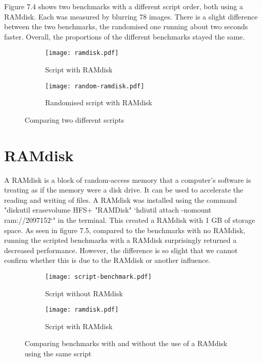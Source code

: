 Figure 7.4 shows two benchmarks with a different script order, both using a RAMdisk. Each was measured by blurring 78 images. There is a slight difference between the two benchmarks, the randomised one running about two seconds faster. Overall, the proportions of the different benchmarks stayed the same.

\begin{figure}[H]
	\centering
	\begin{subfigure}{.5\textwidth}
	  \centering
	  \texttt{[image: ramdisk.pdf]}
	  \caption{Script with RAMdisk}
	  \label{fig:ramdisk}
	\end{subfigure}%
	\begin{subfigure}{.5\textwidth}
	  \centering
	  \texttt{[image: random-ramdisk.pdf]}
	  \caption{Randomised script with RAMdisk}
	  \label{fig:random-ramdisk}
	\end{subfigure}
	\caption{Comparing two different scripts}
	\label{fig:two-scripts}
\end{figure}

\section{RAMdisk}
A RAMdisk is a block of random-access memory that a computer's software is treating as if the memory were a disk drive. It can be used to accelerate the reading and writing of files. A RAMdisk was installed using the command "diskutil erasevolume HFS+ "RAMDisk" `hdiutil attach -nomount ram://2097152`" in the terminal. This created a RAMdisk with 1 GB of storage space.
As seen in figure 7.5, compared to the benchmarks with no RAMdisk, running the scripted benchmarks with a RAMdisk surprisingly returned a decreased performance. However, the difference is so slight that we cannot confirm whether this is due to the RAMdisk or another influence.

\begin{figure}[H]
	\centering
	\begin{subfigure}{.5\textwidth}
	  \centering
	  \texttt{[image: script-benchmark.pdf]}
	  \caption{Script without RAMdisk}
	  \label{fig:script2}
	\end{subfigure}%
	\begin{subfigure}{.5\textwidth}
	  \centering
	  \texttt{[image: ramdisk.pdf]}
	  \caption{Script with RAMdisk}
	  \label{fig:ramdisk2}
	\end{subfigure}
	\caption{Comparing benchmarks with and without the use of a RAMdisk using the same script}
	\label{fig:ramdisk-vs-noramdisk}
\end{figure}

